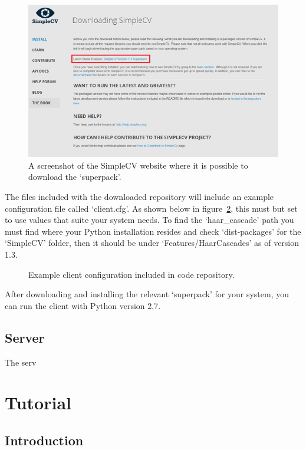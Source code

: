 \documentclass[a4paper]{article}
\begin{document}
\begin{figure}[H]
    \label{fig:simplecv}
    \centering
    \caption{A screenshot of the SimpleCV website where it is possible to download the `superpack'.}
    \includegraphics[scale=0.7]{../shared_assets/screenshots/manual/simplecv_download.png}
\end{figure}

The files included with the downloaded repository will include an example configuration file called `client.cfg'. As shown
below in figure~\ref{fig:clientcfg}, this must but set to use values that suite your system needs. To find the `haar\_cascade'
path you must find where your Python installation resides and check `dist-packages' for the `SimpleCV' folder, then it should
be under `Features/HaarCascades' as of version 1.3.

\begin{figure}[H]
    \label{fig:clientcfg}
    \centering
    \caption{Example client configuration included in code repository.}
    
\end{figure}



After downloading and installing the relevant `superpack' for your system, you can run the client with Python version 2.7.

\subsection{Server}
The serv

\section{Tutorial}
    \subsection{Introduction}
\end{document}
